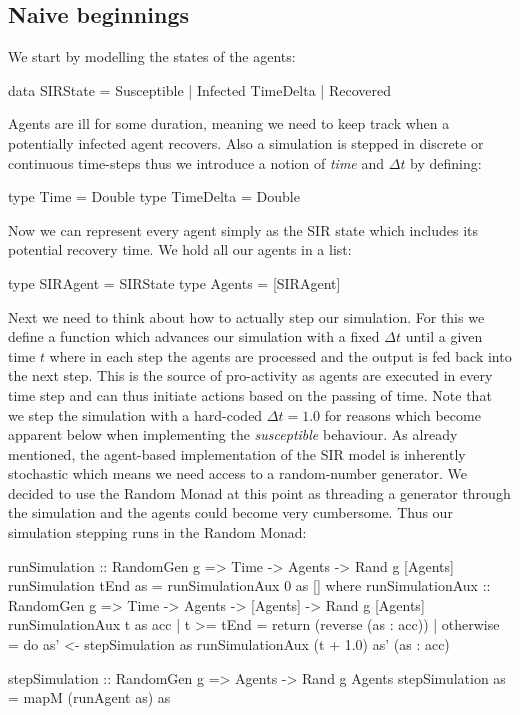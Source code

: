 \subsection{Naive beginnings}
\label{sec:naive_beginnigs}
We start by modelling the states of the agents:

\begin{HaskellCode}
data SIRState = Susceptible | Infected TimeDelta | Recovered
\end{HaskellCode}

Agents are ill for some duration, meaning we need to keep track when a potentially infected agent recovers. Also a simulation is stepped in discrete or continuous time-steps thus we introduce a notion of \textit{time} and $\Delta t$ by defining:

\begin{HaskellCode}
type Time      = Double
type TimeDelta = Double
\end{HaskellCode}

Now we can represent every agent simply as the SIR state which includes its potential recovery time. We hold all our agents in a list:
\begin{HaskellCode}
type SIRAgent = SIRState
type Agents   = [SIRAgent]
\end{HaskellCode}

Next we need to think about how to actually step our simulation. For this we define a function which advances our simulation with a fixed $\Delta t$ until a given time $t$ where in each step the agents are processed and the output is fed back into the next step. This is the source of pro-activity as agents are executed in every time step and can thus initiate actions based on the passing of time. Note that we step the simulation with a hard-coded $\Delta t = 1.0$ for reasons which become apparent below when implementing the \textit{susceptible} behaviour.
As already mentioned, the agent-based implementation of the SIR model is inherently stochastic which means we need access to a random-number generator. We decided to use the Random Monad at this point as threading a generator through the simulation and the agents could become very cumbersome. Thus our simulation stepping runs in the Random Monad:

\begin{HaskellCode}
runSimulation :: RandomGen g 
  => Time -> Agents -> Rand g [Agents]
runSimulation tEnd as = runSimulationAux 0 as []
  where
    runSimulationAux :: RandomGen g 
      => Time -> Agents -> [Agents] -> Rand g [Agents]
    runSimulationAux t as acc
      | t >= tEnd = return (reverse (as : acc))
      | otherwise = do
        as' <- stepSimulation as 
        runSimulationAux (t + 1.0) as' (as : acc)

stepSimulation :: RandomGen g => Agents -> Rand g Agents
stepSimulation as = mapM (runAgent as) as
\end{HaskellCode}

